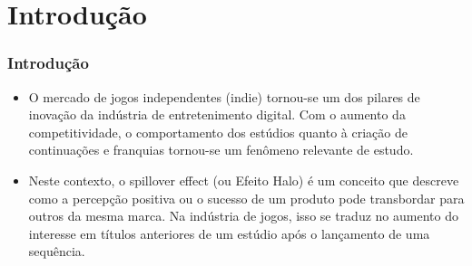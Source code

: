 \section{Introdução}
\begin{frame}
\frametitle{Introdução}
\justifying

\begin{itemize}
    \item  
O mercado de jogos independentes (indie) tornou-se um dos pilares de inovação da
indústria de entretenimento digital. Com o aumento da competitividade, o comportamento dos estúdios quanto
à criação de continuações e franquias tornou-se um fenômeno
relevante de estudo.
    \vspace{0.2cm}

    \item 
Neste contexto, o spillover effect (ou
Efeito Halo) é um conceito que descreve como a percepção
positiva ou o sucesso de um produto pode transbordar para
outros da mesma marca. Na indústria de jogos, isso se traduz
no aumento do interesse em títulos anteriores de um estúdio
após o lançamento de uma sequência.
    \vspace{0.2cm}

\end{itemize}    
\end{frame}